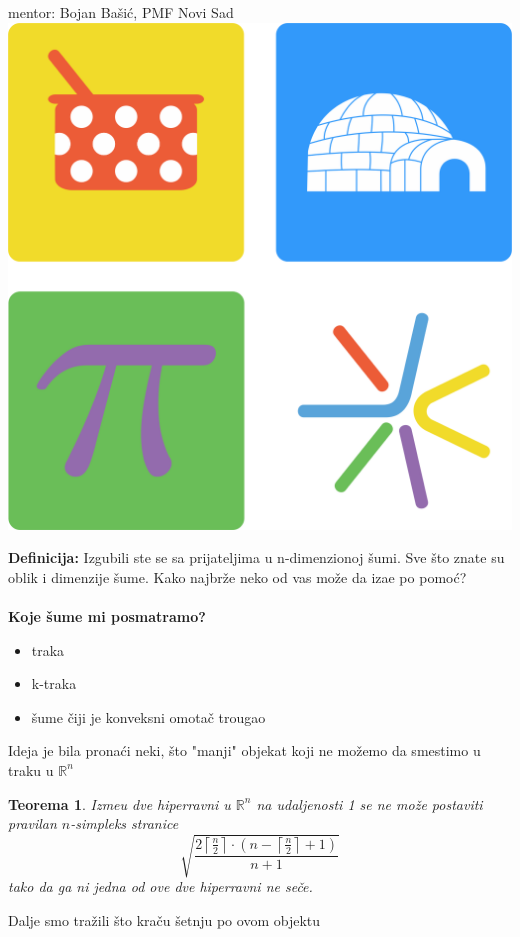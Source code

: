 \documentclass[b1paper,portrait]{template/baposter}
\newtheorem{theorem}{Teorema}
\begin{document}
\begin{poster}
{{		   	mentor: Bojan Ba\v si\' c, PMF Novi Sad
		}
}
{\includegraphics[scale=0.25]{MatLogo}}




{ 
	\textbf{Definicija:}
 	Izgubili ste se sa prijateljima u n-dimenzionoj \v sumi.
 	Sve \v sto znate su oblik i dimenzije \v sume.
 	Kako najbr\v ze neko od vas mo\v ze da iza\dj e po pomo\' c?
 	\\
 	\\
 	\textbf{Koje \v sume mi posmatramo?}
 	\begin{itemize}
 		\item traka
 		\item k-traka
 		\item \v sume \v ciji je konveksni omota\v c trougao
 	\end{itemize}
 	{
	}
   	\vspace{0.15cm}
}


{
 	Ideja je bila  prona\' ci neki, \v sto "manji" objekat koji ne mo\v zemo da smestimo u traku u $\mathbb{R}^n$
 	\begin{theorem}
 		Izme\dj u dve hiperravni u $\mathbb{R}^n$ na udaljenosti 1 se ne mo\v ze postaviti pravilan $n$-simpleks stranice
 		$$\sqrt{\frac{2\left\lceil \frac{n}{2}\right\rceil\cdot \left( n-\left\lceil\frac{n}{2}\right\rceil+1\right)}{n+1}}$$
 		tako da ga ni jedna od ove dve hiperravni ne se\v ce. 
 	\end{theorem}
 	Dalje smo tra\v zili \v sto kra\v cu \v setnju po ovom objektu

}
\end{poster}
\end{document}
